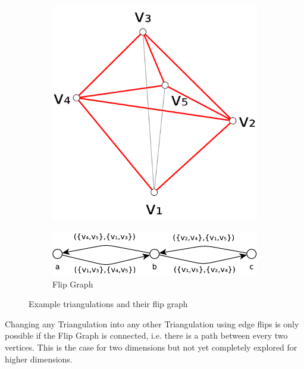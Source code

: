 \begin{figure}[ht]
\begin{subfigure}{0.3\textwidth}
    \caption{}
  \end{subfigure}
  \hspace{0em}
  \VRule
  \hspace{0em}
  \begin{subfigure}{0.3\textwidth}
    \centering
    \includegraphics[width=\textwidth]{img/example_triangulation_3.pdf}
    \caption{}
  \end{subfigure}
  
  \vspace{2em}
  \begin{subfigure}{0.7\textwidth}
    \centering
    \includegraphics[width=\textwidth]{img/example_flip_graph.pdf}
    \caption{Flip Graph}
  \end{subfigure}
  \caption{\label{fig:example_flip_graph}%
    Example triangulations and their flip graph}
\end{figure}

Changing any Triangulation into any other Triangulation using edge
flips is only possible if the Flip Graph is connected, i.e. there is
a path between every two vertices. This is the case for two dimensions
but not yet completely explored for higher dimensions.

